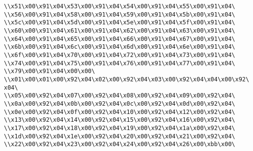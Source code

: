\verb|\\x51\x00\x91\x04\x53\x00\x91\x04\x54\x00\x91\x04\x55\x00\x91\x04\|\newline
\verb|\\x56\x00\x91\x04\x58\x00\x91\x04\x59\x00\x91\x04\x5b\x00\x91\x04\|\newline
\verb|\\x5c\x00\x91\x04\x5d\x00\x91\x04\x5e\x00\x91\x04\x5f\x00\x91\x04\|\newline
\verb|\\x60\x00\x91\x04\x61\x00\x91\x04\x62\x00\x91\x04\x63\x00\x91\x04\|\newline
\verb|\\x64\x00\x91\x04\x65\x00\x91\x04\x66\x00\x91\x04\x67\x00\x91\x04\|\newline
\verb|\\x6b\x00\x91\x04\x6c\x00\x91\x04\x6d\x00\x91\x04\x6e\x00\x91\x04\|\newline
\verb|\\x6f\x00\x91\x04\x70\x00\x91\x04\x72\x00\x91\x04\x73\x00\x91\x04\|\newline
\verb|\\x74\x00\x91\x04\x75\x00\x91\x04\x76\x00\x91\x04\x77\x00\x91\x04\|\newline
\verb|\\x79\x00\x91\x04\x00\x00\|\newline
\verb|\\x01\x00\x01\x00\x92\x04\x02\x00\x92\x04\x03\x00\x92\x04\x04\x00\x92\x04\|\newline
\verb|\\x05\x00\x92\x04\x07\x00\x92\x04\x08\x00\x92\x04\x09\x00\x92\x04\|\newline
\verb|\\x0a\x00\x92\x04\x0b\x00\x92\x04\x0c\x00\x92\x04\x0d\x00\x92\x04\|\newline
\verb|\\x0e\x00\x92\x04\x0f\x00\x92\x04\x10\x00\x92\x04\x12\x00\x92\x04\|\newline
\verb|\\x13\x00\x92\x04\x14\x00\x92\x04\x15\x00\x92\x04\x16\x00\x92\x04\|\newline
\verb|\\x17\x00\x92\x04\x18\x00\x92\x04\x19\x00\x92\x04\x1a\x00\x92\x04\|\newline
\verb|\\x1d\x00\x92\x04\x1e\x00\x92\x04\x20\x00\x92\x04\x21\x00\x92\x04\|\newline
\verb|\\x22\x00\x92\x04\x23\x00\x92\x04\x24\x00\x92\x04\x26\x00\xbb\x00\|\newline
